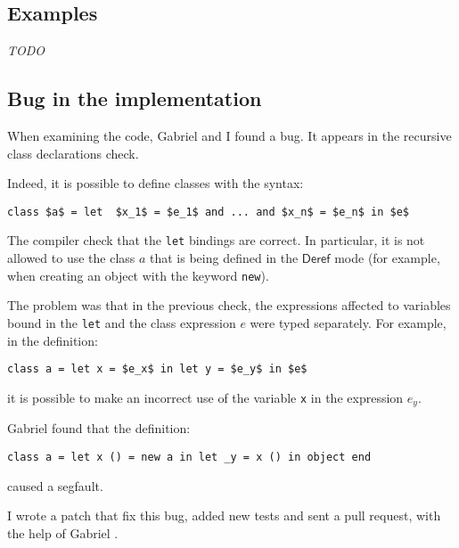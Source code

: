 \documentclass{article}
\newcommand{\Deref}{\mathsf{Deref}}
\begin{document}

\subsection{Examples}
\textit{TODO}

\subsection{Bug in the implementation}
When examining the code, Gabriel and I found a bug. It appears in the recursive
class declarations check.

Indeed, it is possible to define classes with the syntax:
\begin{lstlisting}[mathescape=true]
class $a$ = let  $x_1$ = $e_1$ and ... and $x_n$ = $e_n$ in $e$
\end{lstlisting}
The compiler check that the \lstinline|let| bindings are correct. In
particular, it is not allowed to use the class $a$ that is being defined in the
$\Deref$ mode (for example, when creating an object with the keyword
\lstinline|new|).

%

The problem was that in the previous check, the expressions affected to
variables bound in the \lstinline|let| and the class expression $e$ were
typed separately. For example, in the definition:
\begin{lstlisting}[mathescape=true]
class a = let x = $e_x$ in let y = $e_y$ in $e$
\end{lstlisting}
it is possible to make an incorrect use of the variable \lstinline|x| in the
expression $e_y$.

Gabriel found that the definition:
\begin{lstlisting}
class a = let x () = new a in let _y = x () in object end
\end{lstlisting}
caused a segfault.

I wrote a patch that fix this bug, added new tests and sent a pull request,
with the help of Gabriel \cite{PullRequest}.
\end{document}
